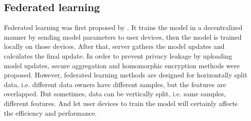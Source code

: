 \subsection{Federated learning}
Federated learning was first proposed by \cite{mcmahan17fed}. It trains the model in a decentralized manner by sending model parameters to user devices, then the model is trained locally on those devices. After that, server gathers the model updates and calculates the final update. In order to prevent privacy leakage by uploading model updates, secure aggregation\cite{bonawitz2017aggre} and homomorphic encryption\cite{phong2018additive} methods were proposed. However, federated learning methods are designed for horizontally split data, i.e. different data owners have different samples, but the features are overlapped. But sometimes, data can be vertically split, i.e. same samples, different features. And let user devices to train the model will certainly affects the efficiency and performance.